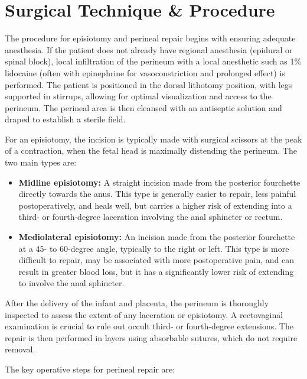 \section*{Surgical Technique \& Procedure}
The procedure for episiotomy and perineal repair begins with ensuring adequate anesthesia. If the patient does not already have regional anesthesia (epidural or spinal block), local infiltration of the perineum with a local anesthetic such as 1\% lidocaine (often with epinephrine for vasoconstriction and prolonged effect) is performed. The patient is positioned in the dorsal lithotomy position, with legs supported in stirrups, allowing for optimal visualization and access to the perineum. The perineal area is then cleansed with an antiseptic solution and draped to establish a sterile field.

For an episiotomy, the incision is typically made with surgical scissors at the peak of a contraction, when the fetal head is maximally distending the perineum. The two main types are:

\begin{itemize}
  \item \textbf{Midline episiotomy:} A straight incision made from the posterior fourchette directly towards the anus. This type is generally easier to repair, less painful postoperatively, and heals well, but carries a higher risk of extending into a third- or fourth-degree laceration involving the anal sphincter or rectum.
  \item \textbf{Mediolateral episiotomy:} An incision made from the posterior fourchette at a 45- to 60-degree angle, typically to the right or left. This type is more difficult to repair, may be associated with more postoperative pain, and can result in greater blood loss, but it has a significantly lower risk of extending to involve the anal sphincter.
\end{itemize}

After the delivery of the infant and placenta, the perineum is thoroughly inspected to assess the extent of any laceration or episiotomy. A rectovaginal examination is crucial to rule out occult third- or fourth-degree extensions. The repair is then performed in layers using absorbable sutures, which do not require removal.

The key operative steps for perineal repair are:

